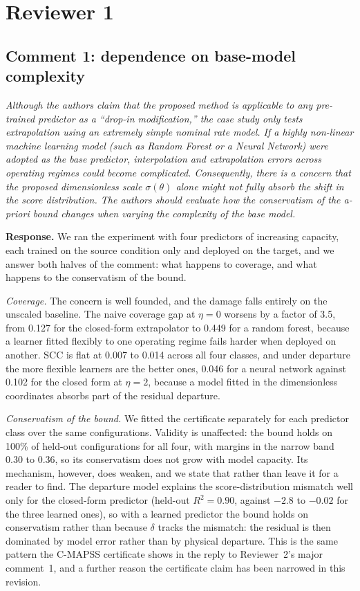 \documentclass[11pt,a4paper]{article}
\newenvironment{comment}
  {\begin{list}{}{\leftmargin=6mm \rightmargin=2mm}\item[]\color{quoteline}\itshape}
  {\end{list}}
\begin{document}
\clearpage
\section*{Reviewer 1}

\subsection*{Comment 1: dependence on base-model complexity}
\begin{comment}
Although the authors claim that the proposed method is applicable to any pre-trained predictor as a
``drop-in modification,'' the case study only tests extrapolation using an extremely simple nominal
rate model. If a highly non-linear machine learning model (such as Random Forest or a Neural
Network) were adopted as the base predictor, interpolation and extrapolation errors across
operating regimes could become complicated. Consequently, there is a concern that the proposed
dimensionless scale $\sigma(\theta)$ alone might not fully absorb the shift in the score
distribution. The authors should evaluate how the conservatism of the a-priori bound changes when
varying the complexity of the base model.
\end{comment}

\noindent\textbf{Response.} We ran the experiment with four predictors of increasing capacity, each
trained on the source condition only and deployed on the target, and we answer both halves of the
comment: what happens to coverage, and what happens to the conservatism of the bound.

\emph{Coverage.} The concern is well founded, and the damage falls entirely on the unscaled
baseline. The naive coverage gap at $\eta=0$ worsens by a factor of 3.5, from 0.127 for the
closed-form extrapolator to 0.449 for a random forest, because a learner fitted flexibly to one
operating regime fails harder when deployed on another. SCC is flat at 0.007 to 0.014 across all
four classes, and under departure the more flexible learners are the better ones, 0.046 for a
neural network against 0.102 for the closed form at $\eta=2$, because a model fitted in the
dimensionless coordinates absorbs part of the residual departure.

\emph{Conservatism of the bound.} We fitted the certificate separately for each predictor class over
the same configurations. Validity is unaffected: the bound holds on 100\% of held-out configurations
for all four, with margins in the narrow band 0.30 to 0.36, so its conservatism does not grow with
model capacity. Its mechanism, however, does weaken, and we state that rather than leave it for a
reader to find. The departure model explains the score-distribution mismatch well only for the
closed-form predictor (held-out $R^2=0.90$, against $-2.8$ to $-0.02$ for the three learned ones),
so with a learned predictor the bound holds on conservatism rather than because $\delta$ tracks the
mismatch: the residual is then dominated by model error rather than by physical departure. This is
the same pattern the C-MAPSS certificate shows in the reply to Reviewer~2's major comment~1, and a
further reason the certificate claim has been narrowed in this revision.
\end{document}
